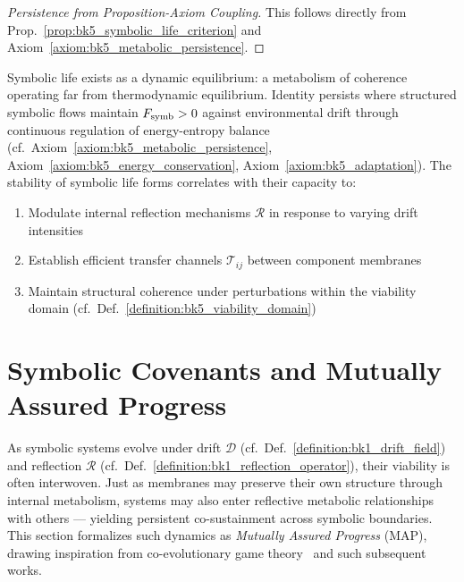 \begin{proof}[Persistence from Proposition-Axiom Coupling]
\label{proof:bk5_proposition_axiom_coupling}
This follows directly from Prop.~\ref{prop:bk5_symbolic_life_criterion} and Axiom~\ref{axiom:bk5_metabolic_persistence}.
\end{proof}

\begin{scholium}
\label{scholium:bk5_symbolic_life}
Symbolic life exists as a dynamic equilibrium: a metabolism of coherence operating far from thermodynamic equilibrium. Identity persists where structured symbolic flows maintain $F_{\mathrm{symb}} > 0$ against environmental drift through continuous regulation of energy-entropy balance (cf.~Axiom~\ref{axiom:bk5_metabolic_persistence}, Axiom~\ref{axiom:bk5_energy_conservation}, Axiom~\ref{axiom:bk5_adaptation}).
The stability of symbolic life forms correlates with their capacity to:
\begin{enumerate}
  \item Modulate internal reflection mechanisms $\mathcal{R}$ in response to varying drift intensities
  \item Establish efficient transfer channels $\mathcal{T}_{ij}$ between component membranes
  \item Maintain structural coherence under perturbations within the viability domain (cf.~Def.~\ref{definition:bk5_viability_domain})
\end{enumerate}
\end{scholium}

\section{Symbolic Covenants and Mutually Assured Progress}
\label{sec:bk5_symbolic_covenants_and_mutually_assured_progress}

As symbolic systems evolve under drift $\mathcal{D}$ (cf.~Def.~\ref{definition:bk1_drift_field}) and reflection $\mathcal{R}$ (cf.~Def.~\ref{definition:bk1_reflection_operator}), their viability is often interwoven. Just as membranes may preserve their own structure through internal metabolism, systems may also enter reflective metabolic relationships with others — yielding persistent co-sustainment across symbolic boundaries. This section formalizes such dynamics as \emph{Mutually Assured Progress} (MAP), drawing inspiration from co-evolutionary game theory~\cite{maynard1982evolution} and such subsequent works.

